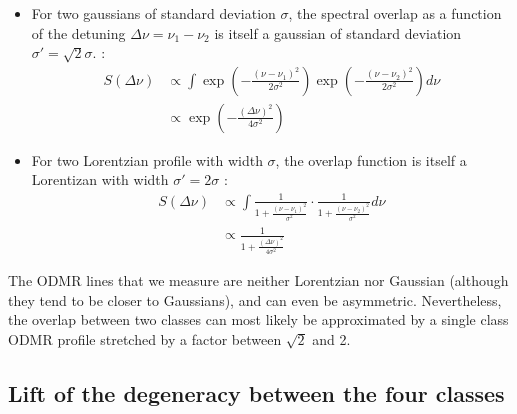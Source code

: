 \documentclass[preprintnumbers,amsmath,amssymb,onecolumn,12pt]{revtex4-2}\usepackage{graphicx}%
\begin{document}
\begin{itemize}
\item For two gaussians of standard deviation $\sigma$, the spectral overlap as a function of the detuning $\Delta \nu = \nu_1-\nu_2$ is itself a gaussian of standard deviation $\sigma'=\sqrt{2} \sigma$. :
\begin{align*}
S(\Delta \nu)&\propto \int \exp(-\frac{(\nu-\nu_1)^2}{2\sigma^2})\exp(-\frac{(\nu-\nu_2)^2}{2\sigma^2}) d\nu \\
&\propto\exp(-\frac{(\Delta \nu)^2}{4\sigma^2})
\end{align*}

\item For two Lorentzian profile with width $\sigma$, the overlap function is itself a Lorentizan with width $\sigma'=2\sigma$ :
\begin{align*}
S(\Delta \nu)&\propto \int \frac{1}{1+ \frac{(\nu-\nu_1)^2}{\sigma^2}}\cdot \frac{1}{1+ \frac{(\nu-\nu_2)^2}{\sigma^2}} d\nu \\
&\propto\frac{1}{1+ \frac{(\Delta \nu)^2}{4\sigma^2}}
\end{align*}
\end{itemize}

The ODMR lines that we measure are neither Lorentzian nor Gaussian (although they tend to be closer to Gaussians), and can even be asymmetric. Nevertheless, the overlap between two classes can most likely be approximated by a single class ODMR profile stretched by a factor between $\sqrt{2}$ and 2.

\subsection{Lift of the degeneracy between the four classes}
\end{document}
